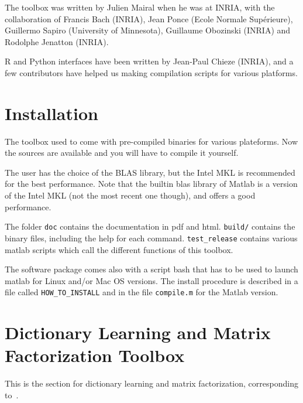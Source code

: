 \documentclass[a4paper, 11pt]{article}
\begin{document}
The toolbox was written by Julien Mairal when he was at INRIA, with the
collaboration of Francis Bach (INRIA), Jean Ponce (Ecole Normale Sup\'erieure),
Guillermo Sapiro (University of Minnesota), Guillaume Obozinski (INRIA) and
Rodolphe Jenatton (INRIA).

R and Python interfaces have been written by Jean-Paul Chieze (INRIA), and a
few contributors have helped us making compilation scripts for various platforms.

\section{Installation}
The toolbox used to come with pre-compiled binaries for various plateforms. 
Now the sources are available and you will have to compile it yourself.

The user has the choice of the BLAS library, but the Intel MKL is recommended
for the best performance. Note that the builtin blas library of Matlab is a
version of the Intel MKL (not the most recent one though), and offers 
a good performance.

The folder \verb|doc| contains the documentation in pdf and html. \verb|build/|
contains the binary files, including the help for each command.
\verb|test_release| contains various matlab scripts which call the different
functions of this toolbox.

The software package comes also with a script bash that has to be used to
launch matlab for Linux and/or Mac OS versions.  The install procedure is
described in a file called \verb|HOW_TO_INSTALL| and in the file
\verb|compile.m| for the Matlab version.

\section{Dictionary Learning and Matrix Factorization Toolbox}
This is the section for dictionary learning and matrix factorization, corresponding to~\cite{mairal7,mairal9}.
\end{document}
